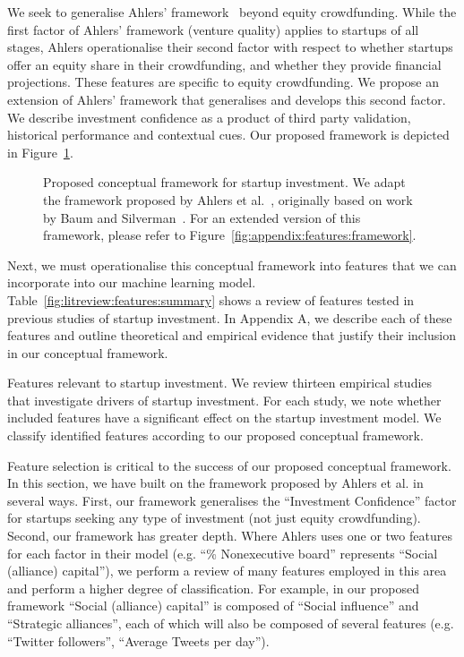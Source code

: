 \documentclass[../thesis/thesis.tex]{subfiles}
\begin{document}
\begin{refsection}
We seek to generalise Ahlers' framework~\cite{ahlers2015} beyond equity crowdfunding. While the first factor of Ahlers' framework (venture quality) applies to startups of all stages, Ahlers operationalise their second factor with respect to whether startups offer an equity share in their crowdfunding, and whether they provide financial projections. These features are specific to equity crowdfunding. We propose an extension of Ahlers' framework that generalises and develops this second factor. We describe investment confidence as a product of third party validation, historical performance and contextual cues. Our proposed framework is depicted in Figure~\ref{fig:litreview:theory:framework}.

\begin{figure}[!htb]
    \centering
    
    \caption{Proposed conceptual framework for startup investment. We adapt the framework proposed by Ahlers et al.~\cite{ahlers2015}, originally based on work by Baum and Silverman~\cite{baum2004}. For an extended version of this framework, please refer to Figure~\ref{fig:appendix:features:framework}.}
    \label{fig:litreview:theory:framework}
\end{figure}

Next, we must operationalise this conceptual framework into features that we can incorporate into our machine learning model. Table~\ref{fig:litreview:features:summary} shows a review of features tested in previous studies of startup investment. In Appendix A, we describe each of these features and outline theoretical and empirical evidence that justify their inclusion in our conceptual framework.

\begin{table}[!htb]
    \centering
    \scalebox{1}{
        
    }
    \caption{Features relevant to startup investment. We review thirteen empirical studies that investigate drivers of startup investment. For each study, we note whether included features have a significant effect on the startup investment model. We classify identified features according to our proposed conceptual framework.}
    \label{fig:litreview:features:summary}
\end{table}

Feature selection is critical to the success of our proposed conceptual framework. In this section, we have built on the framework proposed by Ahlers et al. \cite{ahlers2015} in several ways. First, our framework generalises the ``Investment Confidence'' factor for startups seeking any type of investment (not just equity crowdfunding). Second, our framework has greater depth. Where Ahlers uses one or two features for each factor in their model (e.g. ``\% Nonexecutive board'' represents ``Social (alliance) capital''), we perform a review of many features employed in this area and perform a higher degree of classification. For example, in our proposed framework ``Social (alliance) capital'' is composed of ``Social influence'' and ``Strategic alliances'', each of which will also be composed of several features (e.g. ``Twitter followers'', ``Average Tweets per day'').


\end{refsection}
\end{document}
